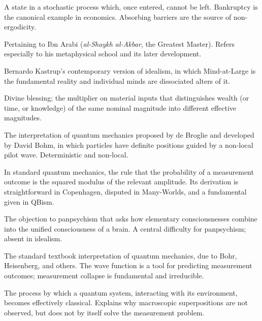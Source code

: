 \documentclass[11pt,a4paper]{book}
\theoremstyle{cleanrm}
\begin{document}
\begin{description}[leftmargin=3.5cm,style=nextline]

\item[Absorbing barrier] A state in a stochastic process which, once
entered, cannot be left. Bankruptcy is the canonical example in
economics. Absorbing barriers are the source of non-ergodicity.

\item[Akbarian] Pertaining to Ibn Arabi (\emph{al-Shaykh al-Akbar},
the Greatest Master). Refers especially to his metaphysical school
and its later development.

\item[Analytical idealism] Bernardo Kastrup's contemporary version of
idealism, in which Mind-at-Large is the fundamental reality and
individual minds are dissociated alters of it.

\item[\emph{Barakah}] Divine blessing; the multiplier on material
inputs that distinguishes wealth (or time, or knowledge) of the same
nominal magnitude into different effective magnitudes.

\item[Bohmian mechanics] The interpretation of quantum mechanics
proposed by de Broglie and developed by David Bohm, in which
particles have definite positions guided by a non-local pilot wave.
Deterministic and non-local.

\item[Born rule] In standard quantum mechanics, the rule that the
probability of a measurement outcome is the squared modulus of the
relevant amplitude. Its derivation is straightforward in Copenhagen,
disputed in Many-Worlds, and a fundamental given in QBism.

\item[Combination problem] The objection to panpsychism that asks how
elementary consciousnesses combine into the unified consciousness of a
brain. A central difficulty for panpsychism; absent in idealism.

\item[Copenhagen interpretation] The standard textbook interpretation
of quantum mechanics, due to Bohr, Heisenberg, and others. The wave
function is a tool for predicting measurement outcomes; measurement
collapse is fundamental and irreducible.

\item[Decoherence] The process by which a quantum system, interacting
with its environment, becomes effectively classical. Explains why
macroscopic superpositions are not observed, but does not by itself
solve the measurement problem.


\end{description}
\end{document}

